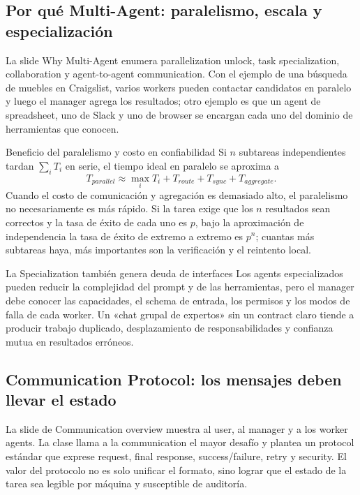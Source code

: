 \subsection{Por qué Multi-Agent: paralelismo, escala y especialización}

La slide Why Multi-Agent enumera parallelization unlock, task specialization, collaboration y agent-to-agent communication. Con el ejemplo de una búsqueda de muebles en Craigslist, varios workers pueden contactar candidatos en paralelo y luego el manager agrega los resultados; otro ejemplo es que un agent de spreadsheet, uno de Slack y uno de browser se encargan cada uno del dominio de herramientas que conocen.


\begin{importantbox}{Beneficio del paralelismo y costo en confiabilidad}
Si $n$ subtareas independientes tardan $\sum_i T_i$ en serie, el tiempo ideal en paralelo se aproxima a
\[
T_{parallel}\approx \max_i T_i+T_{route}+T_{sync}+T_{aggregate}.
\]
Cuando el costo de comunicación y agregación es demasiado alto, el paralelismo no necesariamente es más rápido. Si la tarea exige que los $n$ resultados sean correctos y la tasa de éxito de cada uno es $p$, bajo la aproximación de independencia la tasa de éxito de extremo a extremo es $p^n$; cuantas más subtareas haya, más importantes son la verificación y el reintento local.
\end{importantbox}

\begin{warningbox}{La Specialization también genera deuda de interfaces}
Los agents especializados pueden reducir la complejidad del prompt y de las herramientas, pero el manager debe conocer las capacidades, el schema de entrada, los permisos y los modos de falla de cada worker. Un «chat grupal de expertos» sin un contract claro tiende a producir trabajo duplicado, desplazamiento de responsabilidades y confianza mutua en resultados erróneos.
\end{warningbox}

\subsection{Communication Protocol: los mensajes deben llevar el estado}

La slide de Communication overview muestra al user, al manager y a los worker agents. La clase llama a la communication el mayor desafío y plantea un protocol estándar que exprese request, final response, success/failure, retry y security. El valor del protocolo no es solo unificar el formato, sino lograr que el estado de la tarea sea legible por máquina y susceptible de auditoría.

